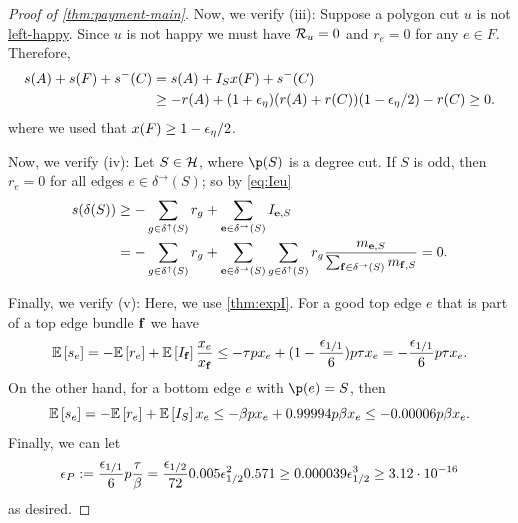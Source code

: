 \begin{proof}[Proof of \cref{thm:payment-main}]
Now, we verify (iii): 
Suppose a polygon cut $u$ is not \hyperlink{tar:hierarchy}{left-happy}. Since $u$ is not happy we must have ${\mathcal{R}}_u=0$ and $r_e=0$ for any $e\in F$.
Therefore,
\begin{align*} s(A) + s(F)+ s^-(C) &= s(A) + I_S x(F) + s^-(C) \\
&\geq -r(A) + (1+{\epsilon}_\eta)(r(A)+r(C))(1-{\epsilon}_\eta/2) -r(C)\geq 0. 	
\end{align*}
where we used that $x(F)\geq 1-{\epsilon}_\eta/2$.


Now, we verify (iv): Let $S\in \mathcal{H}$, where $\p(S)$ is a degree cut. If $S$ is odd, then $r_e=0$ for all edges $e\in \delta^\rightarrow(S)$; so  by \cref{eq:Ieu} %
\begin{align*}
	s(\delta(S)) &\geq -\sum_{g\in\delta^\uparrow(S)} r_g + \sum_{{\bf e}\in \delta^\rightarrow(S)} I_{{\bf e},S}\\
	&=-\sum_{g\in\delta^\uparrow(S)} r_g+ \sum_{{\bf e}\in\delta^\rightarrow(S)}\sum_{g\in\delta^\uparrow(S)} r_g \frac{m_{{\bf e},S}}{\sum_{{\bf f}\in\delta^\rightarrow(S)} m_{{\bf f},S}}=0.
\end{align*}

Finally, we verify (v): Here, we use \cref{thm:expI}. For a good top edge $e$ that is part of a top edge bundle ${\bf f}$ we have
$$ {\mathbb{E}}\left[s_e\right] = -{\mathbb{E}}\left[r_e\right] + {\mathbb{E}}\left[I_{\bf f}\right] \frac{x_e}{x_{\bf f}} \leq -\tau p x_e + (1-\frac{{\epsilon}_{1/1}}{6})p\tau x_e = -\frac{{\epsilon}_{1/1}}{6} p\tau x_e.$$
On the other hand, for a bottom edge $e$ with $\p(e)=S$, then
$$ {\mathbb{E}}\left[s_e\right] = -{\mathbb{E}}\left[r_e\right] + {\mathbb{E}}\left[I_S\right] x_e \leq  -\beta p x_e + 0.99994p\beta x_e \leq -0.00006p\beta x_e.$$
 Finally, we can let 
\begin{equation}\label{eq:epsP}
{\epsilon}_P:=\frac{{\epsilon}_{1/1}}{6}p\frac{\tau}{\beta} = \frac{{\epsilon}_{1/2}}{72} 0.005{\epsilon}_{1/2}^2 0.571 \geq  0.000039 {\epsilon}_{1/2}^3 \geq 3.12 \cdot 10^{-16}
\end{equation}
as desired.
\end{proof}

